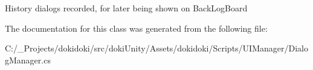 History dialogs recorded, for later being shown on Back\+Log\+Board 



The documentation for this class was generated from the following file\+:\begin{DoxyCompactItemize}
\item 
C\+:/\+\_\+\+Projects/dokidoki/src/doki\+Unity/\+Assets/dokidoki/\+Scripts/\+U\+I\+Manager/Dialog\+Manager.\+cs\end{DoxyCompactItemize}
